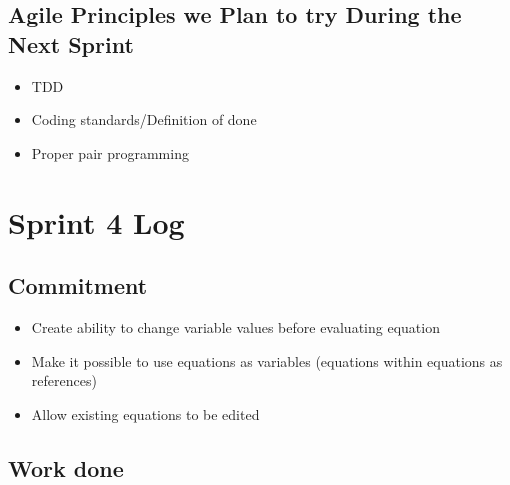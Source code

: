 \documentclass[14]{article}
\begin{document}
\subsection{Agile Principles we Plan to try During the Next Sprint}
\begin{itemize}
    \item TDD
    \item Coding standards/Definition of done
    \item Proper pair programming 
\end{itemize}


\section{Sprint 4 Log}

\subsection{Commitment}

\begin{itemize}
    \item Create ability to change variable values before evaluating equation
    \item Make it possible to use equations as variables (equations within equations as references)
    \item Allow existing equations to be edited
\end{itemize}

\subsection{Work done}
\end{document}
